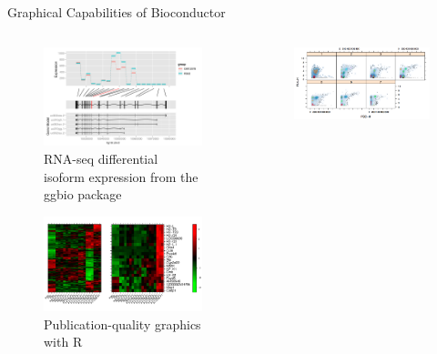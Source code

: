 \documentclass[final]{beamer}
\begin{document}
\begin{frame}[t]
\begin{columns}[t]
\begin{column}{0.48\linewidth}
\begin{block}{Graphical Capabilities of Bioconductor}
\begin{columns}[t]
\begin{column}{0.33\linewidth}
\begin{figure}
              \centering
              \includegraphics[width=0.85\linewidth]{interval}
              \caption{RNA-seq differential isoform expression from the ggbio package}
            \end{figure}
            \begin{figure}
              \centering
              \includegraphics[width=0.85\linewidth]{heatmapPanels}
              \caption{Publication-quality graphics with R}
            \end{figure}
          \end{column}
          \begin{column}{0.33\linewidth}
            \begin{figure}
              \centering
              \includegraphics[width=0.85\linewidth]{flowFilter}

\end{figure}
\end{column}
\end{columns}
\end{block}
\end{column}
\end{columns}
\end{frame}
\end{document}
